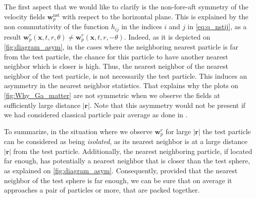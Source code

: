 The first aspect that we would like to clarify is the non-fore-aft symmetry of the velocity fields $\textbf{w}_p^\text{nst}$ with respect to the horizontal plane. 
This is explained by the non commutativity of the function $h_{ij}$ in the indices $i$ and $j$ in \ref{eq:q_nstij}, as a result $\textbf{w}_p^r(\textbf{x},t,r,\theta) \neq \textbf{w}_p^r(\textbf{x},t,r,-\theta)$. 
Indeed, as it is depicted on \ref{fig:diagram_asym}, in the cases where the neighboring nearest particle is far from the test particle, the chance for this particle to have another nearest neighbor which is closer is high. 
Thus, the nearest neighbor of the nearest neighbor of the test particle, is not necessarily the test particle. 
This induces an asymmetry in the nearest neighbor statistics. 
That explains why the plots on \ref{fig:Why_Ga_matter} are not symmetric when we observe the fields at sufficiently large distance $|\textbf{r}|$. 
Note that this asymmetry would not be present if we had considered classical particle pair average as done in \cite{shajahan2023inertial}. 

To summarize, in the situation where we observe $\textbf{w}_p^r$ for large $|\textbf{r}|$ the test particle can be considered as being \textit{isolated}, as its nearest neighbor is at a large distance $|\textbf{r}|$ from the test particle. 
Additionally, the nearest neighboring particle, if located far enough, has 
potentially a nearest neighbor that is closer than the test sphere, as explained on \ref{fig:diagram_asym}. 
Consequently, provided that the nearest neighbor of the test sphere is far enough, we can be sure that on average it approaches a pair of particles or more, that are packed together. 

